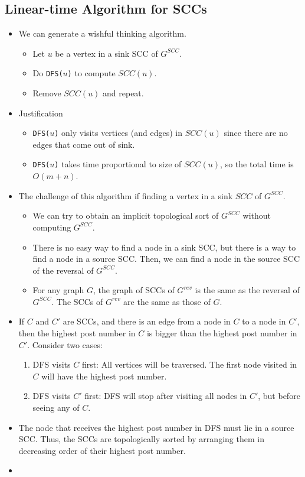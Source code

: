 \subsection{Linear-time Algorithm for SCCs}
\begin{itemize}
    \item We can generate a wishful thinking algorithm.
    \begin{itemize}
        \item Let $u$ be a vertex in a sink SCC of $G^{SCC}$.
        \item Do \texttt{DFS($u$)} to compute $SCC(u)$.
        \item Remove $SCC(u)$ and repeat.
    \end{itemize}
    \item Justification
    \begin{itemize}
        \item \texttt{DFS($u$)} only visits vertices (and edges) in $SCC(u)$ since there are no edges that come out of sink.
        \item \texttt{DFS($u$)} takes time proportional to size of $SCC(u)$, so the total time is $O(m + n)$.
    \end{itemize}
    \item The challenge of this algorithm if finding a vertex in a sink $SCC$ of $G^{SCC}$.
    \begin{itemize}
        \item We can try to obtain an implicit topological sort of $G^{SCC}$ without computing $G^{SCC}$.
        \item There is no easy way to find a node in a sink SCC, but there is a way to find a node in a source SCC. Then, we can find a node in the source SCC of the reversal of $G^{SCC}$.
        \item For any graph $G$, the graph of SCCs of $G^{rev}$ is the same as the reversal of $G^{SCC}$. The SCCs of $G^{rev}$ are the same as those of $G$.
    \end{itemize}
    \item If $C$ and $C'$ are SCCs, and there is an edge from a node in $C$ to a node in $C'$, then the highest post number in $C$ is bigger than the highest post number in $C'$. Consider two cases:
    \begin{enumerate}
        \item DFS visits $C$ first: All vertices will be traversed. The first node visited in $C$ will have the highest post number.
        \item DFS visits $C'$ first: DFS will stop after visiting all nodes in $C'$, but before seeing any of $C$.
    \end{enumerate}
    \item The node that receives the highest post number in DFS must lie in a source SCC. Thus, the SCCs are topologically sorted by arranging them in decreasing order of their highest post number. 
    \item[] 
\end{itemize}

